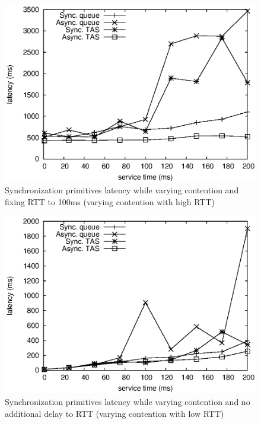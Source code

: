 \begin{figure}[h]
\centering
\includegraphics[scale=0.68]{img/primitives_vary-contention_rtt-100.eps}
\caption{Synchronization primitives latency while varying contention and fixing RTT to 100ms (varying contention with high RTT)}
\label{fig:primitives_vary_contention_rtt100}
\end{figure}

\begin{figure}[h]
\centering
\includegraphics[scale=0.68]{img/primitives_vary-contention_rtt-0.eps}
\caption{Synchronization primitives latency while varying contention and no additional delay to RTT (varying contention with low RTT)}
\label{fig:primitives_vary_contention_rtt0}
\end{figure}

